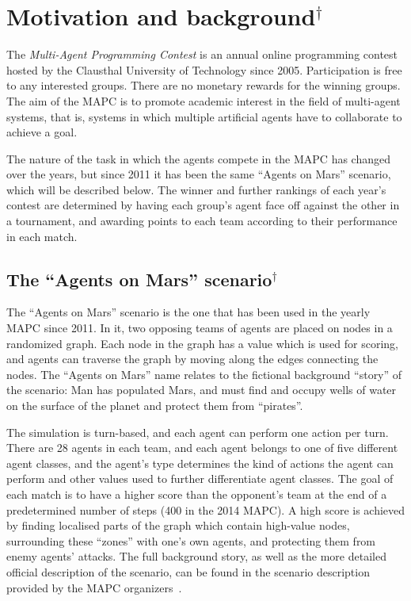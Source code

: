 \section{Motivation and background$^\dagger$}
The \emph{Multi-Agent Programming Contest} is an annual online programming contest hosted by the Clausthal University of Technology since 2005.
Participation is free to any interested groups.
There are no monetary rewards for the winning groups.
The aim of the MAPC is to promote academic interest in the field  of multi-agent systems, that is, systems in which multiple artificial agents have to collaborate to achieve a goal.

The nature of the task in which the agents compete in the MAPC has changed over the years, but since 2011 it has been the same \enquote{Agents on Mars} scenario, which will be described below.
The winner and further rankings of each year's contest are determined by having each group's agent face off against the other in a tournament, and awarding points to each team according to their performance in each match.

\subsection{The \enquote{Agents on Mars} scenario$^\dagger$}
The \enquote{Agents on Mars} scenario is the one that has been used in the yearly MAPC since 2011.
In it, two opposing teams of agents are placed on nodes in a randomized graph.
Each node in the graph has a value which is used for scoring, and agents can traverse the graph by moving along the edges connecting the nodes.
The \enquote{Agents on Mars} name relates to the fictional background \enquote{story} of the scenario: Man has populated Mars, and must find and occupy wells of water on the surface of the planet and protect them from \enquote{pirates}.

The simulation is turn-based, and each agent can perform one action per turn.
There are 28 agents in each team, and each agent belongs to one of five different agent classes, and the agent's type determines the kind of actions the agent can perform and other values used to further differentiate agent classes.
The goal of each match is to have a higher score than the opponent's team at the end of a predetermined number of steps (400 in the 2014 MAPC).
A high score is achieved by finding localised parts of the graph which contain high-value nodes, surrounding these \enquote{zones} with one's own agents, and protecting them from enemy agents' attacks.
The full background story, as well as the more detailed official description of the scenario, can be found in the scenario description provided by the MAPC organizers~\cite{ahlbrecht_mapc_2014}.

